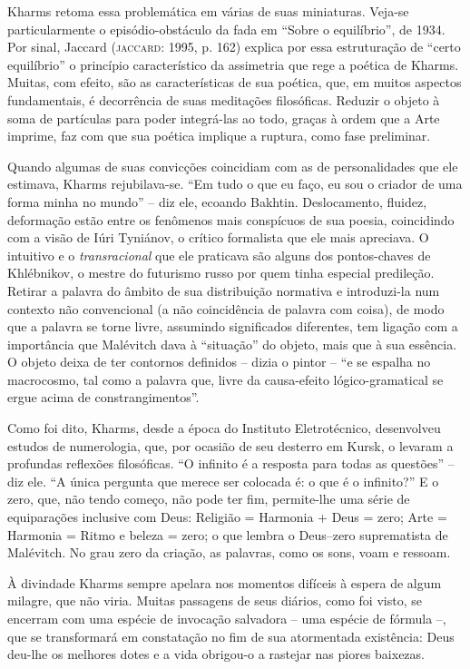Kharms retoma essa problemática em várias de suas miniaturas. Veja-se
particularmente o episódio-obstáculo da fada em ``Sobre o equilíbrio'',
de 1934. Por sinal, Jaccard (\textsc{jaccard}: 1995, p. 162) explica por
essa estruturação de ``certo equilíbrio'' o princípio característico da
assimetria que rege a poética de Kharms. Muitas, com efeito, são as
características de sua poética, que, em muitos aspectos fundamentais, é
decorrência de suas meditações filosóficas. Reduzir o objeto à soma de
partículas para poder integrá-las ao todo, graças à ordem que a Arte
imprime, faz com que sua poética implique a ruptura, como fase
preliminar.

Quando algumas de suas convicções coincidiam com as de personalidades
que ele estimava, Kharms rejubilava-se. ``Em tudo o que eu faço, eu sou
o criador de uma forma minha no mundo'' -- diz ele, ecoando Bakhtin.
Deslocamento, fluidez, deformação estão entre os fenômenos mais
conspícuos de sua poesia, coincidindo com a visão de Iúri Tyniánov, o
crítico formalista que ele mais apreciava. O intuitivo e o
\emph{transracional} que ele praticava são alguns dos pontos-chaves de
Khlébnikov, o mestre do futurismo russo por quem tinha especial
predileção. Retirar a palavra do âmbito de sua distribuição normativa e
introduzi-la num contexto não convencional (a não coincidência de
palavra com coisa), de modo que a palavra se torne livre, assumindo
significados diferentes, tem ligação com a importância que Malévitch
dava à ``situação'' do objeto, mais que à sua essência. O objeto deixa
de ter contornos definidos -- dizia o pintor -- ``e se espalha no
macrocosmo, tal como a palavra que, livre da causa-efeito
lógico-gramatical se ergue acima de constrangimentos''.

Como foi dito, Kharms, desde a época do Instituto Eletrotécnico,
desenvolveu estudos de numerologia, que, por ocasião de seu desterro em
Kursk, o levaram a profundas reflexões filosóficas. ``O infinito é a
resposta para todas as questões'' -- diz ele. ``A única pergunta que
merece ser colocada é: o que é o infinito?'' E o zero, que, não tendo
começo, não pode ter fim, permite-lhe uma série de equiparações
inclusive com Deus: Religião = Harmonia + Deus = zero; Arte = Harmonia =
Ritmo e beleza = zero; o que lembra o Deus--zero suprematista de
Malévitch. No grau zero da criação, as palavras, como os sons, voam e
ressoam.

À divindade Kharms sempre apelara nos momentos difíceis à espera de
algum milagre, que não viria. Muitas passagens de seus diários, como foi
visto, se encerram com uma espécie de invocação salvadora -- uma espécie
de fórmula --, que se transformará em constatação no fim de sua
atormentada existência: Deus deu-lhe os melhores dotes e a vida
obrigou-o a rastejar nas piores baixezas.

